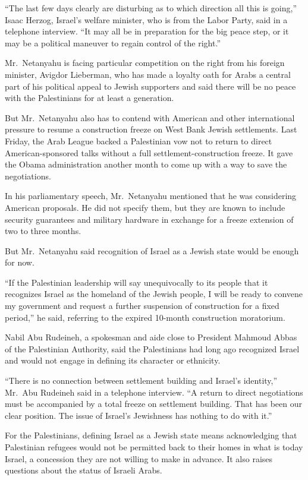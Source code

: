 ﻿\documentclass[12pt]{article}
\begin{document}
``The last few days clearly are disturbing as to which direction all this is going,'' Isaac Herzog,
Israel's welfare minister, who is from the Labor Party, said in a telephone interview. ``It may all
be in preparation for the big peace step, or it may be a political maneuver to regain control of the
right.''

Mr.~Netanyahu is facing particular competition on the right from his foreign minister, Avigdor
Lieberman, who has made a loyalty oath for Arabs a central part of his political appeal to Jewish
supporters and said there will be no peace with the Palestinians for at least a generation.

But Mr.~Netanyahu also has to contend with American and other international pressure to resume a
construction freeze on West Bank Jewish settlements. Last Friday, the Arab League backed a
Palestinian vow not to return to direct American-sponsored talks without a full
settlement-construction freeze. It gave the Obama administration another month to come up with a way
to save the negotiations.

In his parliamentary speech, Mr.~Netanyahu mentioned that he was considering American proposals. He
did not specify them, but they are known to include security guarantees and military hardware in
exchange for a freeze extension of two to three months.

But Mr.~Netanyahu said recognition of Israel as a Jewish state would be enough for now.

``If the Palestinian leadership will say unequivocally to its people that it recognizes Israel as
the homeland of the Jewish people, I will be ready to convene my government and request a further
suspension of construction for a fixed period,'' he said, referring to the expired 10-month
construction moratorium.

Nabil Abu Rudeineh, a spokesman and aide close to President Mahmoud Abbas of the Palestinian
Authority, said the Palestinians had long ago recognized Israel and would not engage in defining its
character or ethnicity.

``There is no connection between settlement building and Israel's identity,'' Mr.~Abu Rudeineh said
in a telephone interview. ``A return to direct negotiations must be accompanied by a total freeze on
settlement building. That has been our clear position. The issue of Israel's Jewishness has nothing
to do with it.''

For the Palestinians, defining Israel as a Jewish state means acknowledging that Palestinian
refugees would not be permitted back to their homes in what is today Israel, a concession they are
not willing to make in advance. It also raises questions about the status of Israeli Arabs.
\end{document}
